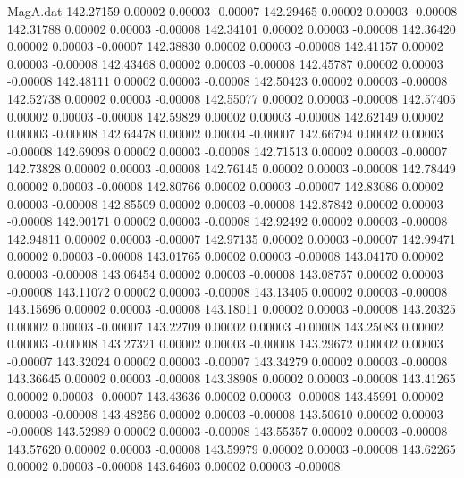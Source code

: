 \begin{filecontents}{MagA.dat}
 142.27159    0.00002    0.00003   -0.00007
 142.29465    0.00002    0.00003   -0.00008
 142.31788    0.00002    0.00003   -0.00008
 142.34101    0.00002    0.00003   -0.00008
 142.36420    0.00002    0.00003   -0.00007
 142.38830    0.00002    0.00003   -0.00008
 142.41157    0.00002    0.00003   -0.00008
 142.43468    0.00002    0.00003   -0.00008
 142.45787    0.00002    0.00003   -0.00008
 142.48111    0.00002    0.00003   -0.00008
 142.50423    0.00002    0.00003   -0.00008
 142.52738    0.00002    0.00003   -0.00008
 142.55077    0.00002    0.00003   -0.00008
 142.57405    0.00002    0.00003   -0.00008
 142.59829    0.00002    0.00003   -0.00008
 142.62149    0.00002    0.00003   -0.00008
 142.64478    0.00002    0.00004   -0.00007
 142.66794    0.00002    0.00003   -0.00008
 142.69098    0.00002    0.00003   -0.00008
 142.71513    0.00002    0.00003   -0.00007
 142.73828    0.00002    0.00003   -0.00008
 142.76145    0.00002    0.00003   -0.00008
 142.78449    0.00002    0.00003   -0.00008
 142.80766    0.00002    0.00003   -0.00007
 142.83086    0.00002    0.00003   -0.00008
 142.85509    0.00002    0.00003   -0.00008
 142.87842    0.00002    0.00003   -0.00008
 142.90171    0.00002    0.00003   -0.00008
 142.92492    0.00002    0.00003   -0.00008
 142.94811    0.00002    0.00003   -0.00007
 142.97135    0.00002    0.00003   -0.00007
 142.99471    0.00002    0.00003   -0.00008
 143.01765    0.00002    0.00003   -0.00008
 143.04170    0.00002    0.00003   -0.00008
 143.06454    0.00002    0.00003   -0.00008
 143.08757    0.00002    0.00003   -0.00008
 143.11072    0.00002    0.00003   -0.00008
 143.13405    0.00002    0.00003   -0.00008
 143.15696    0.00002    0.00003   -0.00008
 143.18011    0.00002    0.00003   -0.00008
 143.20325    0.00002    0.00003   -0.00007
 143.22709    0.00002    0.00003   -0.00008
 143.25083    0.00002    0.00003   -0.00008
 143.27321    0.00002    0.00003   -0.00008
 143.29672    0.00002    0.00003   -0.00007
 143.32024    0.00002    0.00003   -0.00007
 143.34279    0.00002    0.00003   -0.00008
 143.36645    0.00002    0.00003   -0.00008
 143.38908    0.00002    0.00003   -0.00008
 143.41265    0.00002    0.00003   -0.00007
 143.43636    0.00002    0.00003   -0.00008
 143.45991    0.00002    0.00003   -0.00008
 143.48256    0.00002    0.00003   -0.00008
 143.50610    0.00002    0.00003   -0.00008
 143.52989    0.00002    0.00003   -0.00008
 143.55357    0.00002    0.00003   -0.00008
 143.57620    0.00002    0.00003   -0.00008
 143.59979    0.00002    0.00003   -0.00008
 143.62265    0.00002    0.00003   -0.00008
 143.64603    0.00002    0.00003   -0.00008

\end{filecontents}
